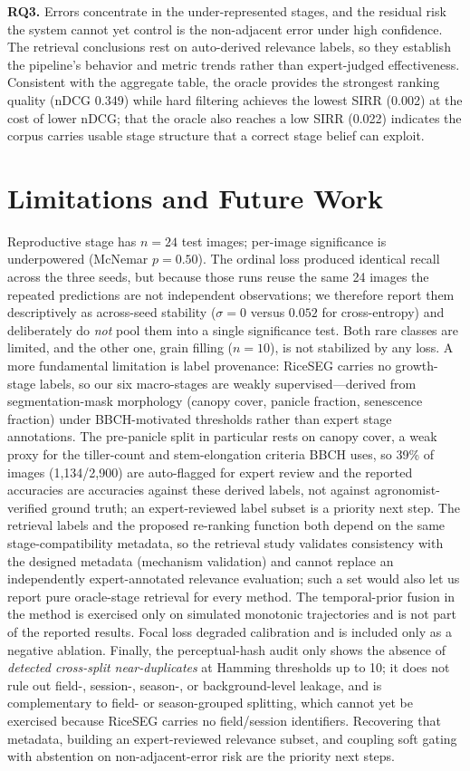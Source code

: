 \documentclass{llncs}
\begin{document}
\textbf{RQ3.} Errors concentrate in the under-represented stages, and the residual risk the system cannot yet control is the non-adjacent error under high confidence. The retrieval conclusions rest on auto-derived relevance labels, so they establish the pipeline's behavior and metric trends rather than expert-judged effectiveness. Consistent with the aggregate table, the oracle provides the strongest ranking quality (nDCG 0.349) while hard filtering achieves the lowest SIRR (0.002) at the cost of lower nDCG; that the oracle also reaches a low SIRR (0.022) indicates the corpus carries usable stage structure that a correct stage belief can exploit.

\section{Limitations and Future Work}
\label{sec:limitations}

Reproductive stage has $n=24$ test images; per-image significance is underpowered (McNemar $p=0.50$). The ordinal loss produced identical recall across the three seeds, but because those runs reuse the same 24 images the repeated predictions are not independent observations; we therefore report them descriptively as across-seed stability ($\sigma=0$ versus $0.052$ for cross-entropy) and deliberately do \emph{not} pool them into a single significance test. Both rare classes are limited, and the other one, grain filling ($n=10$), is not stabilized by any loss. A more fundamental limitation is label provenance: RiceSEG carries no growth-stage labels, so our six macro-stages are weakly supervised---derived from segmentation-mask morphology (canopy cover, panicle fraction, senescence fraction) under BBCH-motivated thresholds rather than expert stage annotations. The pre-panicle split in particular rests on canopy cover, a weak proxy for the tiller-count and stem-elongation criteria BBCH uses, so 39\% of images (1{,}134/2{,}900) are auto-flagged for expert review and the reported accuracies are accuracies against these derived labels, not against agronomist-verified ground truth; an expert-reviewed label subset is a priority next step. The retrieval labels and the proposed re-ranking function both depend on the same stage-compatibility metadata, so the retrieval study validates consistency with the designed metadata (mechanism validation) and cannot replace an independently expert-annotated relevance evaluation; such a set would also let us report pure oracle-stage retrieval for every method. The temporal-prior fusion in the method is exercised only on simulated monotonic trajectories and is not part of the reported results. Focal loss degraded calibration and is included only as a negative ablation. Finally, the perceptual-hash audit only shows the absence of \emph{detected cross-split near-duplicates} at Hamming thresholds up to 10; it does not rule out field-, session-, season-, or background-level leakage, and is complementary to field- or season-grouped splitting, which cannot yet be exercised because RiceSEG carries no field/session identifiers. Recovering that metadata, building an expert-reviewed relevance subset, and coupling soft gating with abstention on non-adjacent-error risk are the priority next steps.
\end{document}
